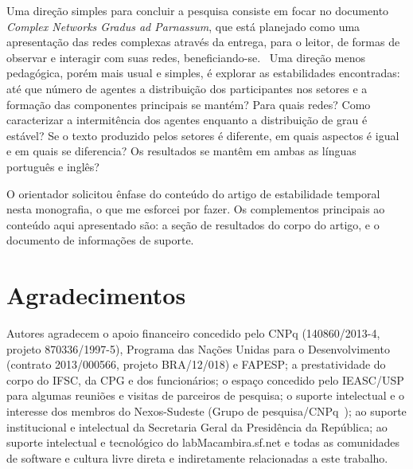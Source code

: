 \documentclass[a4paper,openright,12pt]{report} %
\begin{document}
Uma direção simples para concluir a pesquisa
consiste em focar no documento \emph{Complex Networks Gradus ad Parnassum},
que está planejado como uma apresentação das redes complexas através
da entrega, para o leitor, de formas de observar e interagir com suas redes, beneficiando-se.~\cite{gradus}
Uma direção menos pedagógica, porém mais usual e simples, é
explorar as estabilidades encontradas: até que número de
agentes a distribuição dos participantes nos setores e a
formação das componentes principais se mantém? Para quais redes?
Como caracterizar a intermitência dos agentes enquanto a distribuição de
grau é estável? Se o texto produzido pelos setores é diferente,
em quais aspectos é igual e em quais se diferencia?
Os resultados se mantêm em ambas as línguas português e inglês?

O orientador solicitou
ênfase do conteúdo do
artigo de estabilidade temporal~\cite{timeS}
nesta monografia, o que me esforcei
por fazer.
Os complementos principais ao conteúdo aqui apresentado
são: a seção de resultados
do corpo do artigo,
e o documento de informações de suporte.~\cite{timeSS}



\section*{Agradecimentos}
Autores agradecem o apoio financeiro concedido pelo CNPq (140860/2013-4, projeto 870336/1997-5), Programa das Nações Unidas para o Desenvolvimento (contrato 2013/000566, projeto BRA/12/018) e FAPESP; a prestatividade do corpo do IFSC, da CPG e dos funcionários; o  espaço concedido pelo IEASC/USP para algumas reuniões e visitas de parceiros de pesquisa;
o suporte intelectual e o interesse dos membros do Nexos-Sudeste (Grupo de pesquisa/CNPq~\cite{nexos});
ao suporte institucional e intelectual da Secretaria Geral da Presidência da República;
ao suporte intelectual e tecnológico do labMacambira.sf.net
e todas as comunidades de software e cultura livre direta 
e indiretamente relacionadas a este trabalho.
\end{document}
